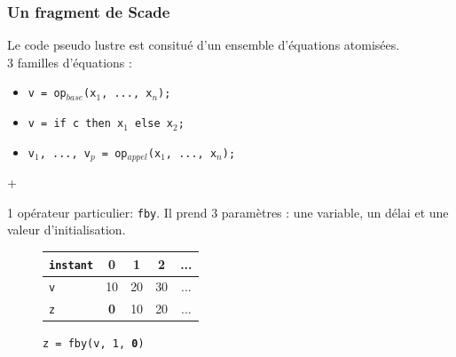 \documentclass[10pt]{beamer}
\begin{document}
\begin{frame}
\frametitle{Un fragment de Scade}
Le code pseudo lustre est consitué d'un ensemble d'équations atomisées.\\
\vspace{0.7cm}
3 familles d'équations :
\begin{itemize}
\item \texttt{v = op$_{base}$(x$_1$, ..., x$_n$);}
\item \texttt{v = if c then x$_1$ else x$_2$;}
\item \texttt{v$_1$, ..., v$_p$ = op$_{appel}$(x$_1$, ..., x$_n$);}
\end{itemize}
\vspace{0.2cm}
\begin{huge}\begin{center}+\end{center}\end{huge}
\vspace{0.2cm}

1 opérateur particulier: \texttt{fby}. Il prend 3 paramètres : une variable, un délai et une
valeur d'initialisation.

\begin{figure}[h]
\begin{center}
\begin{tabular}{ l || c | c | c | c }
\texttt{instant} & 0 & 1 & 2 & ... \\ \hline
\texttt{v} & 10 & 20 & 30 & ... \\
\texttt{z} & \textbf{0} & 10 & 20 & ... \\
\end{tabular}
\end{center}
\caption{\texttt{z = fby(v, 1, \textbf{0})}}
\end{figure}

\end{frame}


\end{document}
